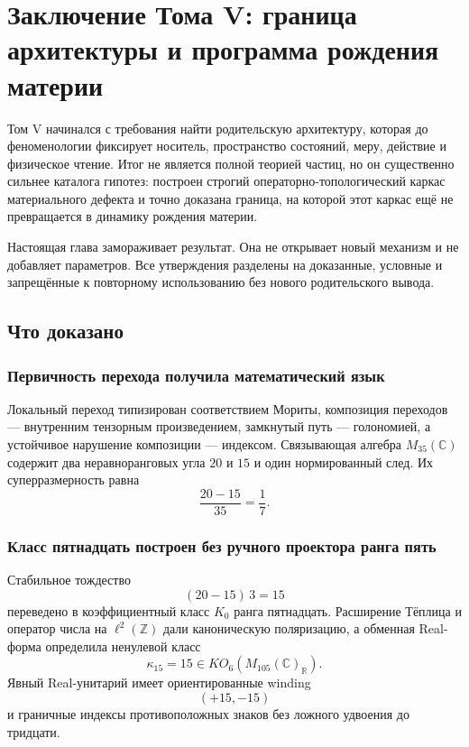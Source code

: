 \chapter{Заключение Тома V: граница архитектуры и программа рождения материи}

Том V начинался с требования найти родительскую архитектуру, которая до
феноменологии фиксирует носитель, пространство состояний, меру, действие и
физическое чтение. Итог не является полной теорией частиц, но он существенно
сильнее каталога гипотез: построен строгий операторно-топологический каркас
материального дефекта и точно доказана граница, на которой этот каркас ещё
не превращается в динамику рождения материи.

Настоящая глава замораживает результат. Она не открывает новый механизм и
не добавляет параметров. Все утверждения разделены на доказанные,
условные и запрещённые к повторному использованию без нового родительского
вывода.

\section{Что доказано}

\subsection{Первичность перехода получила математический язык}

Локальный переход типизирован соответствием Мориты, композиция переходов
--- внутренним тензорным произведением, замкнутый путь --- голономией, а
устойчивое нарушение композиции --- индексом. Связывающая алгебра
$M_{35}(\mathbb C)$ содержит два неравноранговых угла $20$ и $15$ и один
нормированный след. Их суперразмерность равна
\begin{equation}
 \frac{20-15}{35}=\frac17.
 \label{eq:v5-final-superdimension}
\end{equation}

\subsection{Класс пятнадцать построен без ручного проектора ранга пять}

Стабильное тождество
\begin{equation}
 (20-15)\,3=15
\end{equation}
переведено в коэффициентный класс $K_0$ ранга пятнадцать. Расширение
Тёплица и оператор числа на $\ell^2(\mathbb Z)$ дали каноническую
поляризацию, а обменная Real-форма определила ненулевой класс
\begin{equation}
 \kappa_{15}=15\in KO_6(M_{105}(\mathbb C)_{\mathbb R}).
\end{equation}
Явный Real-унитарий имеет ориентированные winding
\begin{equation}
 (+15,-15)
\end{equation}
и граничные индексы противоположных знаков без ложного удвоения до
тридцати.


